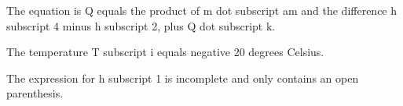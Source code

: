 The equation is Q equals the product of m dot subscript am and the difference h subscript 4 minus h subscript 2, plus Q dot subscript k.

The temperature T subscript i equals negative 20 degrees Celsius.

The expression for h subscript 1 is incomplete and only contains an open parenthesis.
